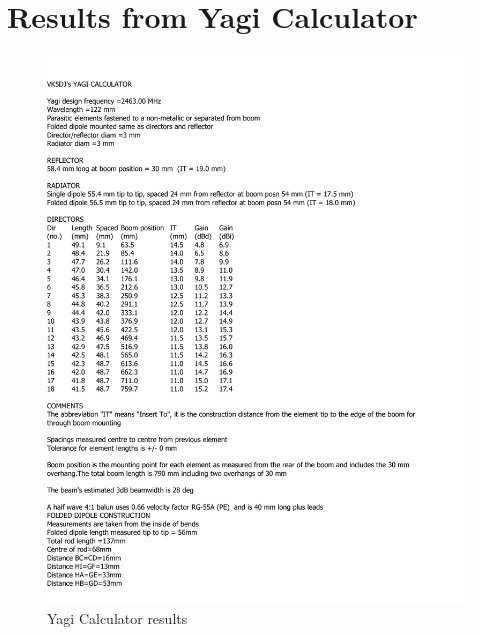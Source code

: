 \chapter{Results from Yagi Calculator}
\begin{figure}[h!]
\centering
\includegraphics[trim={0 0 0 0},clip,scale=0.65]{figures/results.pdf}
\caption{Yagi Calculator results\cite{PCBRules}}
\end{figure}